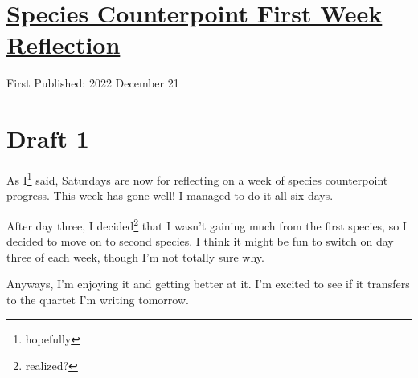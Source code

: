 \documentclass[12pt]{article}[titlepage]
\newcommand{\1}{\={a}}
\newcommand{\2}{\={e}}
\newcommand{\3}{\={\i}}
\newcommand{\4}{\=o}
\newcommand{\5}{\=u}
\newcommand{\6}{\={A}}
\renewcommand{\,}{\textsuperscript{,}}
\begin{document}
\doublespacing
\section{\href{species-counterpoint-week-1.html}{Species Counterpoint First Week Reflection}}
First Published: 2022 December 21

\section{Draft 1}
As I\footnote{hopefully} said, Saturdays are now for reflecting on a week of species counterpoint progress.
This week has gone well!
I managed to do it all six days.

After day three, I decided\footnote{realized?} that I wasn't gaining much from the first species, so I decided to move on to second species.
I think it might be fun to switch on day three of each week, though I'm not totally sure why.

Anyways, I'm enjoying it and getting better at it.
I'm excited to see if it transfers to the quartet I'm writing tomorrow.
\end{document}
